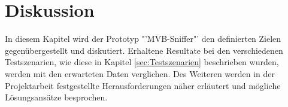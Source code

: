 



\chapter{Diskussion} %
\label{chapter5:Diskussion} %








In diesem Kapitel wird der Prototyp "'MVB-Sniffer"' den definierten Zielen gegenübergestellt und diskutiert. Erhaltene Resultate bei den verschiedenen Testszenarien, wie diese in Kapitel \ref{sec:Testszenarien} beschrieben wurden, werden mit den erwarteten Daten verglichen. Des Weiteren werden in der Projektarbeit festgestellte Herausforderungen näher erläutert und mögliche Lösungsansätze besprochen.

